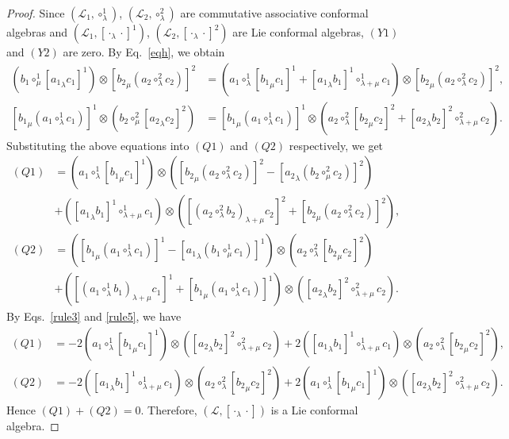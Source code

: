 \documentclass[11pt,letterpaper,reqno]{amsart}
\theoremstyle{definition}
\numberwithin{equation}{section}
\begin{document}
\begin{proof}
Since $(\mathcal{L}_1 ,\circ^{1}_{\lambda})$, $(\mathcal{L}_2 ,\circ^{2}_{\lambda})$ are commutative associative conformal algebras and 
$(\mathcal{L}_1,[\cdot_{\lambda}\cdot]^1)$, $(\mathcal{L}_2,[\cdot_{\lambda}\cdot]^2)$ are Lie conformal algebras, $(Y1)$ and $(Y2)$ are zero.
By Eq.~\eqref{eqh}, we obtain
\begin{align*}
(b_1\circ^{1}_\mu [{a_1}_{\lambda}c_1]^{1})\otimes [{b_2}_{\mu}(a_2\circ^{2}_\lambda c_2)]^{2}
&=(a_1\circ^{1}_\lambda [{b_1}_{\mu}c_1]^{1}+[{a_1}_{\lambda}b_1]^{1}\circ^{1}_{\lambda+\mu}c_1)\otimes [{b_2}_{\mu}(a_2\circ^{2}_\lambda c_2)]^{2},\\
[{b_1}_{\mu}(a_1\circ^{1}_\lambda c_1)]^{1}\otimes (b_2\circ^{2}_\mu [{a_2}_{\lambda}c_2]^{2})
&=[{b_1}_{\mu}(a_1\circ^{1}_\lambda c_1)]^{1}\otimes (a_2\circ^{2}_\lambda [{b_2}_{\mu}c_2]^{2}+[{a_2}_{\lambda}b_2]^{2}\circ^{2}_{\lambda+\mu}c_2).
\end{align*}
Substituting the above equations into $(Q1)$ and $(Q2)$ respectively, we get
\begin{align*}
(Q1)&=(a_1\circ^{1}_\lambda [{b_1}_{\mu}c_1]^{1})\otimes ([{b_2}_{\mu}(a_2\circ^{2}_\lambda c_2)]^{2}-[{a_2}_{\lambda}(b_2\circ^{2}_\mu c_2)]^{2})\\
&+([{a_1}_{\lambda}b_1]^{1}\circ^{1}_{\lambda+\mu} c_1)\otimes ([{(a_2\circ^{2}_\lambda b_2)}_{\lambda+\mu}c_2]^{2}+[{b_2}_{\mu}(a_2\circ^{2}_\lambda c_2)]^{2}),\\
(Q2)&=([{b_1}_{\mu}(a_1\circ^{1}_\lambda c_1)]^{1}-[{a_1}_{\lambda}(b_1\circ^{1}_\mu c_1)]^{1})\otimes (a_2\circ^{2}_\lambda [{b_2}_{\mu}c_2]^{2})\\
&+([{(a_1\circ^{1}_\lambda b_1)}_{\lambda+\mu}c_1]^{1}+[{b_1}_{\mu}(a_1\circ^{1}_\lambda c_1)]^{1})\otimes ([{a_2}_{\lambda}b_2]^{2}\circ^{2}_{\lambda+\mu} c_2).
\end{align*}
By Eqs.~\eqref{rule3} and \eqref{rule5}, we have
\begin{align*}
(Q1)&=-2(a_1\circ^{1}_\lambda [{b_1}_{\mu}c_1]^{1})\otimes ([{a_2}_{\lambda}b_2]^{2}\circ^2_{\lambda+\mu}c_2)
+2([{a_1}_{\lambda}b_1]^{1}\circ^{1}_{\lambda+\mu} c_1)\otimes (a_2\circ^{2}_\lambda [{b_2}_{\mu}c_2]^{2}),\\
(Q2)&=-2([{a_1}_{\lambda}b_1]^{1}\circ^1_{\lambda+\mu}c_1)\otimes (a_2\circ^{2}_\lambda [{b_2}_{\mu}c_2]^{2})
+2(a_1\circ^{1}_\lambda [{b_1}_{\mu}c_1]^{1})\otimes ([{a_2}_{\lambda}b_2]^{2}\circ^{2}_{\lambda+\mu} c_2).
\end{align*}
Hence $(Q1)+(Q2)=0$. Therefore, $(\mathcal L,[\cdot_\lambda\cdot])$ is a Lie conformal algebra.


\end{proof}
\end{document}
